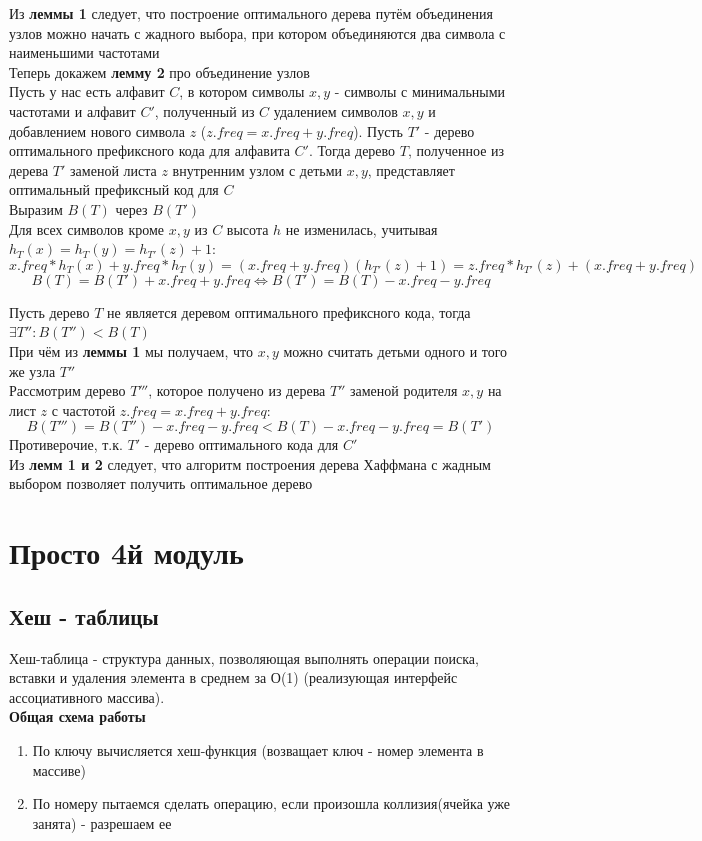 \documentclass[a4paper,10pt]{article}
\begin{document}
Из \textbf{леммы 1} следует, что построение оптимального дерева путём объединения узлов можно начать с жадного выбора, при котором объединяются два символа с наименьшими частотами \\
Теперь докажем \textbf{лемму 2} про объединение узлов \\
Пусть у нас есть алфавит $C$, в котором символы $x, y$ - символы с минимальными частотами и алфавит $C'$, полученный из $C$ удалением символов $x,y$ и добавлением нового символа $z$ ($z.freq = x.freq + y.freq$). Пусть $T'$ - дерево оптимального префиксного кода для алфавита $C'$. Тогда дерево $T$, полученное из дерева $T'$ заменой листа $z$ внутренним узлом с детьми $x,y$, представляет оптимальный префиксный код для $C$ \\
Выразим $B(T)$ через $B(T')$\\
Для всех символов кроме $x, y$ из $C$ высота $h$ не изменилась, учитывая $h_T(x) = h_T(y) = h_{T'}(z) + 1$:
\[
	x.freq * h_T(x) + y.freq * h_T(y) = (x.freq + y.freq)(h_{T'}(z) + 1) = z.freq*h_{T'}(z) + (x.freq + y.freq)
\]
\[
	B(T) = B(T') + x.freq + y.freq \Leftrightarrow B(T') = B(T) - x.freq - y.freq
\]

Пусть дерево $T$ не является деревом оптимального префиксного кода, тогда $\exists T'' \colon B(T'') < B(T)$ \\
При чём из \textbf{леммы 1} мы получаем, что $x,y$ можно считать детьми одного и того же узла $T''$ \\
Рассмотрим дерево $T'''$, которое получено из дерева $T''$ заменой родителя $x,y$ на лист $z$ с частотой $z.freq = x.freq + y.freq$:
\[
	B(T''') = B(T'') - x.freq - y.freq < B(T) - x.freq - y.freq = B(T')
\]
Противерочие, т.к. $T'$ - дерево оптимального кода для $C'$ \\
Из \textbf{лемм 1 и 2} следует, что алгоритм построения дерева Хаффмана с жадным выбором позволяет получить оптимальное дерево
 
\section{Просто 4й модуль}
\subsection{Хеш - таблицы}
Хеш-таблица - структура данных, позволяющая выполнять операции поиска, вставки и удаления элемента в среднем за О(1) (реализующая интерфейс ассоциативного массива).\\
\textbf{Общая схема работы}\\
\begin{enumerate}
	\item По ключу вычисляется хеш-функция (возващает ключ - номер элемента в массиве)
	\item По номеру пытаемся сделать операцию, если произошла коллизия(ячейка уже занята) - разрешаем ее
\end{enumerate}
\end{document}
